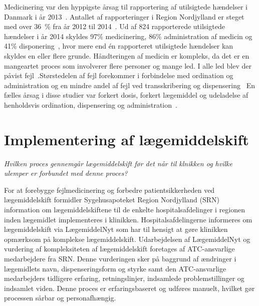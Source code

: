 Medicinering var den hyppigste årsag til rapportering af utilsigtede hændelser i Danmark i år 2013~\citep{Patientombuddet2013}. Antallet af rapporteringer i Region Nordjylland er steget med over 36~\% fra år 2012 til 2014~\citep{Jensen2014}. Ud af 824 rapporterede utilsigtede hændelser i år 2014 skyldes 97\% medicinering, 86\% administration af medicin og 41\% disponering~\citep{Jensen2014}, hvor mere end én rapporteret utilsigtede hændelser kan skyldes en eller flere grunde.  Håndteringen af medicin er kompleks, da det er en mangeartet proces som involverer flere personer og mange led. I alle led blev der påvist fejl~\citep{Barker2002,Sundhedsstyrelsen2005, Lisby2005, Tully2009}.Størstedelen af fejl forekommer i forbindelse med ordination og administration og en mindre andel af fejl ved transskribering og dispensering~\citep{Agrawal2009, Anderson2002} En fælles årsag i disse studier var forkert dosis, forkert lægemiddel og udeladelse af henholdsvis ordination, dispensering og administration~\citep{Barker2002,Sundhedsstyrelsen2005,Lisby2005, Tully2009}.


\section{Implementering af lægemiddelskift}
\textit{Hvilken proces gennemgår lægemiddelskift før det når til klnikken og hvilke ulemper er forbundet med denne proces?}



For at forebygge fejlmedicinering og forbedre patientsikkerheden ved lægemiddelskift formidler Sygehusapoteket Region Nordjylland (SRN) information om lægemiddelskiftene til de enkelte hospitalsafdelinger i regionen inden lægemidlet implementeres i klinikken. Hospitalsafdelingerne informeres om lægemiddelskift via LægemiddelNyt som har til hensigt at gøre klinikken opmærksom på komplekse lægemiddelskift. Udarbejdelsen af LægemiddelNyt og vurdering af kompleksiteten af lægemiddelskift foretages af ATC-ansvarlige medarbejdere fra SRN. Denne vurderingen sker på baggrund af ændringer i lægemidlets navn, dispenseringsform og styrke samt den ATC-ansvarlige medarbejders tidligere erfaring, retningslinjer, indsamlede problemstillinger og indsamlet viden. Denne proces er erfaringsbaseret og udføres manuelt, hvilket gør processen  sårbar og personafhængig. 


